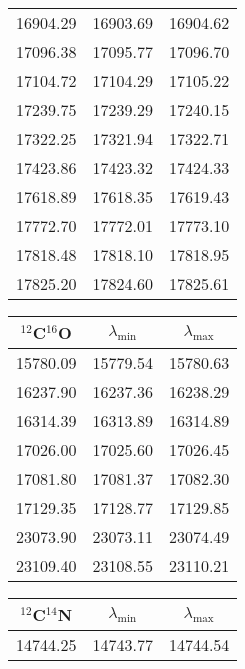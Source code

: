 \documentclass{article}
\begin{document}
\begin{table}[h!]
\begin{minipage}[t]{.4\linewidth}
\begin{center}
\begin{tabular}{ccc}
        16904.29 & 16903.69 & 16904.62 \\
        17096.38 & 17095.77 & 17096.70 \\
        17104.72 & 17104.29 & 17105.22 \\
        17239.75 & 17239.29 & 17240.15 \\
        17322.25 & 17321.94 & 17322.71 \\
        17423.86 & 17423.32 & 17424.33 \\
        17618.89 & 17618.35 & 17619.43 \\
        17772.70 & 17772.01 & 17773.10 \\
        17818.48 & 17818.10 & 17818.95 \\
        17825.20 & 17824.60 & 17825.61 \\
        \hline
        \end{tabular} \par
        \vspace{1cm}
        \begin{tabular}{ccc}
          \hline
          \hline
          $^{12}$C$^{16}$O & $\lambda_{\mathrm{min}}$ & $\lambda_{\mathrm{max}}$ \\
          \hline
          15780.09 & 15779.54 & 15780.63 \\
          16237.90 & 16237.36 & 16238.29 \\
          16314.39 & 16313.89 & 16314.89 \\
          17026.00 & 17025.60 & 17026.45 \\
          17081.80 & 17081.37 & 17082.30 \\
          17129.35 & 17128.77 & 17129.85 \\
          23073.90 & 23073.11 & 23074.49 \\
          23109.40 & 23108.55 & 23110.21 \\
          \hline
          \end{tabular}
    \end{center} 
    \end{minipage} 
    \hspace{2.0cm}
    \begin{minipage}[t]{.4\linewidth}
    \begin{center}
      \vfill
      \begin{tabular}{ccc}
        \hline
        \hline
        $^{12}$C$^{14}$N & $\lambda_{\mathrm{min}}$ & $\lambda_{\mathrm{max}}$ \\
        \hline
        14744.25 & 14743.77 & 14744.54 \\

\end{tabular}
\end{center}
\end{minipage}
\end{table}
\end{document}
